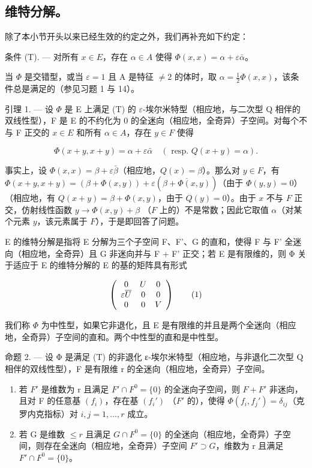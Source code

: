 \subsection{维特分解。}

除了本小节开头以来已经生效的约定之外，我们再补充如下约定：

条件 (T). --- 对所有 \(x \in E\)，存在 \(\alpha \in A\) 使得 \(\Phi(x, x) = \alpha + \varepsilon\bar{\alpha}\)。

当 \(\Phi\) 是交错型，或当 \(\varepsilon = 1\) 且 A 是特征 \(\neq 2\) 的体时，取 \(\alpha = \frac{1}{2}\Phi(x, x)\)，该条件总是满足的（参见习题 1 与 14）。

引理 1. --- 设 \(\Phi\) 是 E 上满足 (T) 的 \(\varepsilon\)-埃尔米特型（相应地，与二次型 Q 相伴的双线性型），F 是 E 的不约化为 0 的全迷向（相应地，全奇异）子空间。对每个不与 F 正交的 \(x \in E\) 和所有 \(\alpha \in A\)，存在 \(y \in F\) 使得

\[
\Phi (x + y, x + y) = \alpha + \varepsilon \bar {\alpha} \quad (\text { resp. } Q (x + y) = \alpha).
\]

事实上，设 \(\Phi(x, x) = \beta + \varepsilon\bar{\beta}\)（相应地，\(Q(x) = \beta\)）。那么对 \(y \in F\)，有 \(\Phi(x + y, x + y) = (\beta + \Phi(x, y)) + \varepsilon(\overline{\beta + \Phi(x, y)})\)（由于 \(\Phi(y, y) = 0\)）（相应地，有 \(Q(x + y) = \beta + \Phi(x, y)\)，由于 \(Q(y) = 0\)）。由于 \(x\) 不与 \(F\) 正交，仿射线性函数 \(y \to \Phi(x, y) + \beta\) （\(F\) 上的）不是常数；因此它取值 \(\alpha\)（对某个元素 \(y\)，该元素属于 \(F\)），于是即回答了问题。

E 的维特分解是指将 E 分解为三个子空间 F、F'、G 的直和，使得 F 与 F' 全迷向（相应地，全奇异）且 G 非迷向并与 F + F' 正交；若 E 是有限维的，则 Φ 关于适应于 E 的维特分解的 E 的基的矩阵具有形式

\[
\left( \begin{array}{c c c} 0 & U & 0 \\ \varepsilon \overline {{U}} & 0 & 0 \\ 0 & 0 & V \end{array} \right)\tag{1}
\]

我们称 \(\Phi\) 为中性型，如果它非退化，且 E 是有限维的并且是两个全迷向（相应地，全奇异）子空间的直和。两个中性型的直和是中性型。

命题 2. --- 设 Φ 是满足 (T) 的非退化 ε-埃尔米特型（相应地，与非退化二次型 Q 相伴的双线性型），F 是有限维 r 的全迷向（相应地，全奇异）子空间。

\begin{enumerate}
\def\labelenumi{\alph{enumi})}
\item
  若 \(F'\) 是维数为 r 且满足 \(F' \cap F^{0} = \{0\}\) 的全迷向子空间，则 \(F + F'\) 非迷向，且对 F 的任意基 \((f_{i})\)，存在基 \((f_{i}')\) （\(F'\) 的），使得 \(\Phi(f_{i}, f_{j}') = \delta_{ij}\)（克罗内克指标）对 \(i, j = 1, \ldots, r\) 成立。
\item
  若 G 是维数 \(\leqslant r\) 且满足 \(G \cap F^{0} = \{0\}\) 的全迷向（相应地，全奇异）子空间，则存在全迷向（相应地，全奇异）子空间 \(F' \supset G\)，维数为 r 且满足 \(F' \cap F^{0} = \{0\}\)。
\end{enumerate}

